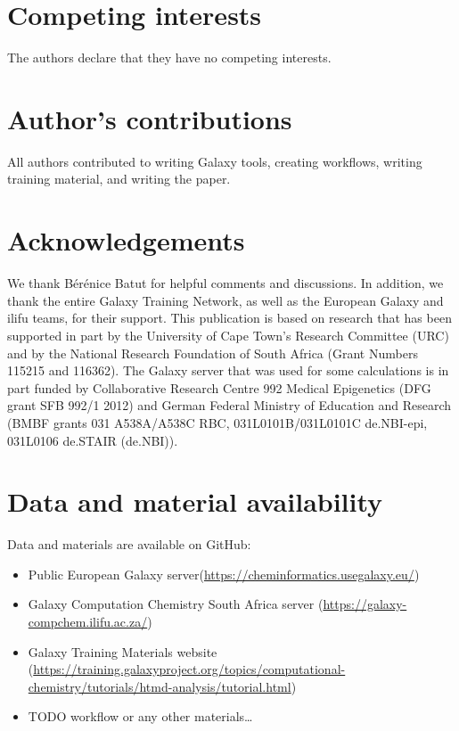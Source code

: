 \documentclass[twocolumn]{bmcart}%
\begin{document}
\begin{backmatter}

\section*{Competing interests}
  The authors declare that they have no competing interests.

\section*{Author's contributions}
All authors contributed to writing Galaxy tools, creating workflows, writing training material, and writing the paper.

\section*{Acknowledgements}
We thank Bérénice Batut for helpful comments and discussions. In addition, we thank the entire Galaxy Training Network, as well as the European Galaxy and ilifu teams, for their support. 
This publication is based on research that has been supported in part by the University of Cape Town’s Research Committee (URC) and by the National Research Foundation of South Africa (Grant Numbers 115215 and 116362).
The Galaxy server that was used for some calculations is in part funded by Collaborative Research Centre 992 Medical Epigenetics (DFG grant SFB 992/1 2012) and German Federal Ministry of Education and Research (BMBF grants 031 A538A/A538C RBC, 031L0101B/031L0101C de.NBI-epi, 031L0106 de.STAIR (de.NBI)).

\section*{Data and material availability}
  Data and materials are available on GitHub:

  \begin{itemize}
  \item   Public European Galaxy server(\url{https://cheminformatics.usegalaxy.eu/}) 
  \item Galaxy Computation Chemistry South Africa server (\url{https://galaxy-compchem.ilifu.ac.za/})
  \item Galaxy Training Materials website (\url{https://training.galaxyproject.org/topics/computational-chemistry/tutorials/htmd-analysis/tutorial.html})
  \item   TODO workflow or any other materials\ldots
\end{itemize}



\end{backmatter}
\end{document}
